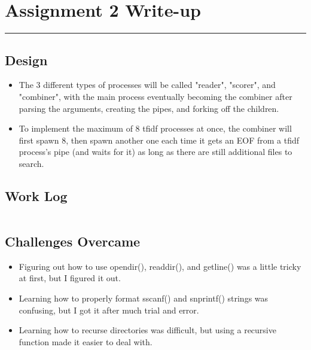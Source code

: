 \documentclass[letterpaper,10pt,fleqn]{article}
\numberwithin{equation}{section}
\begin{document}

\section*{Assignment 2 Write-up}
\hrule

\subsection*{Design}
\begin{itemize}
    \item The 3 different types of processes will be called "reader", "scorer", and "combiner", with the main process eventually becoming the combiner after parsing the arguments, creating the pipes, and forking off the children.
    \item To implement the maximum of 8 tfidf processes at once, the combiner will first spawn 8, then spawn another one each time it gets an EOF from a tfidf process's pipe (and waits for it) as long as there are still additional files to search.
\end{itemize}

\subsection*{Work Log}
\begin{verbatim}

\end{verbatim}

\subsection*{Challenges Overcame}
\begin{itemize}
    \item Figuring out how to use opendir(), readdir(), and getline() was a little tricky at first, but I figured it out.
    \item Learning how to properly format sscanf() and snprintf() strings was confusing, but I got it after much trial and error.
    \item Learning how to recurse directories was difficult, but using a recursive function made it easier to deal with.
\end{itemize}
\end{document}
